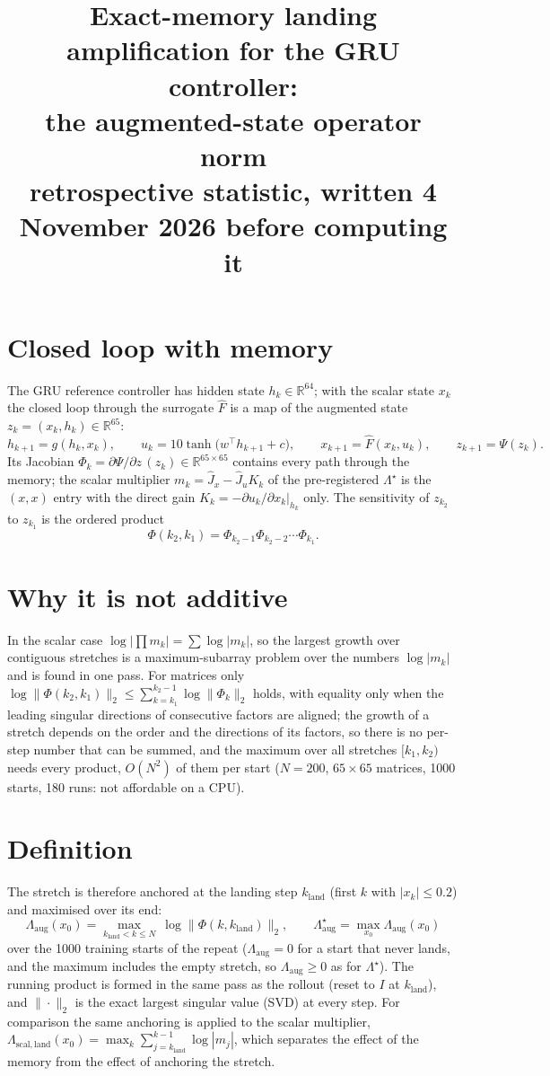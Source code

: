\documentclass[11pt]{article}
\title{Exact-memory landing amplification for the GRU controller:\\ the augmented-state operator norm\\[2pt]\large retrospective statistic, written 4 November 2026 before computing it}
\author{}\date{}
\begin{document}
\maketitle

\section*{Closed loop with memory}
The GRU reference controller has hidden state $h_k\in\mathbb R^{64}$; with the scalar state $x_k$ the closed loop through the
surrogate $\hat F$ is a map of the augmented state $z_k=(x_k,h_k)\in\mathbb R^{65}$:
\[
h_{k+1}=g(h_k,x_k),\qquad u_k=10\tanh\!\big(w^\top h_{k+1}+c\big),\qquad x_{k+1}=\hat F(x_k,u_k),\qquad
z_{k+1}=\Psi(z_k).
\]
Its Jacobian $\Phi_k=\partial\Psi/\partial z\,(z_k)\in\mathbb R^{65\times65}$ contains every path through the memory; the
scalar multiplier $m_k=\hat J_x-\hat J_uK_k$ of the pre-registered $\Lambda^\star$ is the $(x,x)$ entry with the direct gain
$K_k=-\partial u_k/\partial x_k|_{h_k}$ only. The sensitivity of $z_{k_2}$ to $z_{k_1}$ is the ordered product
\[
\Phi(k_2,k_1)=\Phi_{k_2-1}\Phi_{k_2-2}\cdots\Phi_{k_1}.
\]

\section*{Why it is not additive}
In the scalar case $\log|\prod m_k|=\sum\log|m_k|$, so the largest growth over contiguous stretches is a maximum-subarray
problem over the numbers $\log|m_k|$ and is found in one pass. For matrices only
$\log\|\Phi(k_2,k_1)\|_2\le\sum_{k=k_1}^{k_2-1}\log\|\Phi_k\|_2$ holds, with equality only when the leading singular directions
of consecutive factors are aligned; the growth of a stretch depends on the order and the directions of its factors, so there is
no per-step number that can be summed, and the maximum over all stretches $[k_1,k_2)$ needs every product, $O(N^2)$ of them per
start ($N=200$, $65\times65$ matrices, 1000 starts, 180 runs: not affordable on a CPU).

\section*{Definition}
The stretch is therefore anchored at the landing step $k_\mathrm{land}$ (first $k$ with $|x_k|\le0.2$) and maximised over its
end:
\[
\Lambda_{\mathrm{aug}}(x_0)=\max_{k_\mathrm{land}<k\le N}\ \log\big\|\Phi(k,k_\mathrm{land})\big\|_2,\qquad
\Lambda^\star_{\mathrm{aug}}=\max_{x_0}\Lambda_{\mathrm{aug}}(x_0)
\]
over the 1000 training starts of the repeat ($\Lambda_{\mathrm{aug}}=0$ for a start that never lands, and the maximum includes
the empty stretch, so $\Lambda_{\mathrm{aug}}\ge0$ as for $\Lambda^\star$). The running product is formed in the same pass as the
rollout (reset to $I$ at $k_\mathrm{land}$), and $\|\cdot\|_2$ is the exact largest singular value (SVD) at every step. For
comparison the same anchoring is applied to the scalar multiplier, $\Lambda_{\mathrm{scal,land}}(x_0)=\max_k\sum_{j=k_\mathrm{land}}^{k-1}\log|m_j|$,
which separates the effect of the memory from the effect of anchoring the stretch.
\end{document}
